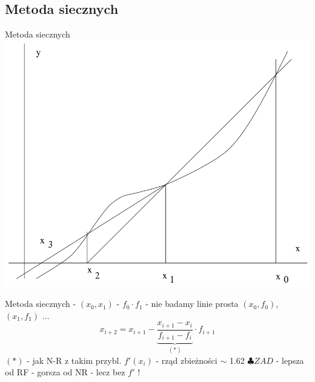 \subsection{Metoda siecznych}
\begin{frame}{Metoda siecznych}
	\centering \includegraphics[width=.8\linewidth]{img/7/7_6_4}
\end{frame}
\begin{frame}{Metoda siecznych}
	- $(x_{0}, x_{1})$\linebreak
	- $f_{0} \cdot f_{1}$ - nie badamy\linebreak
	linie prosta $(x_{0}, f_{0})$, $(x_{1}, f_{1})$ $\ldots$
	\[
		x_{i+2} = x_{i+1} - \underbrace{\frac{x_{i+1} - x_{i}}{f_{i+1} - f_{i}}}_{(*)} \cdot f_{i+1}
	\]
	$(*)$ - jak N-R z takim przybl. $f'(x_{i})$ \linebreak\linebreak
	- rząd zbieżności $\sim$ 1.62 \hspace{5cm} $\clubsuit ZAD$\linebreak
	- lepsza od RF\linebreak
	- gorsza od NR - lecz bez $f'$ !
\end{frame}